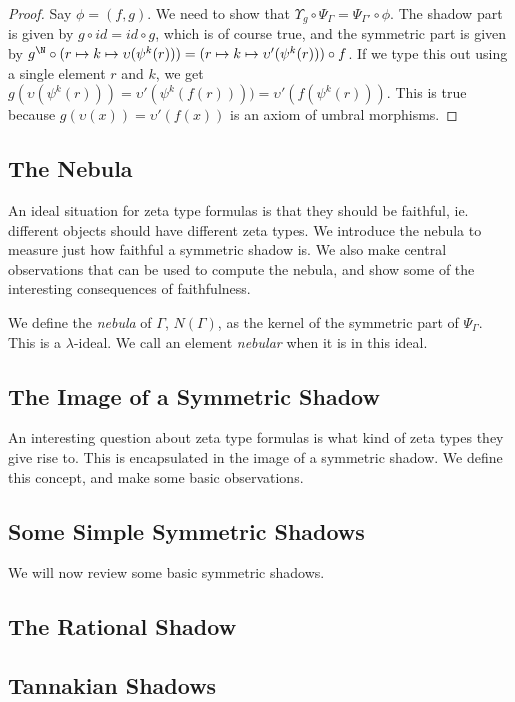 \begin{proof}
  Say $\phi = (f, g)$. We need to show that $\Upsilon_{g} \circ \Psi_\Gamma = \Psi_{\Gamma'} \circ \phi$. The shadow part is given by $g \circ id = id \circ g$, which is of course true, and the symmetric part is given by $g^{\N} \circ (r \mapsto k \mapsto \upsilon(\psi^k(r))) = (r \mapsto k \mapsto \upsilon'(\psi^k(r))) \circ f$. If we type this out using a single element $r$ and $k$, we get $g(\upsilon(\psi^k(r))) = \upsilon'(\psi^k(f(r)))) = \upsilon'(f(\psi^k(r)))$. This is true because $g(\upsilon(x)) = \upsilon'(f(x))$ is an axiom of umbral morphisms. \qedhere
\end{proof}

\subsection{The Nebula}
An ideal situation for zeta type formulas is that they should be faithful, ie. different objects should have different zeta types. We introduce the nebula to measure just how faithful a symmetric shadow is. We also make central observations that can be used to compute the nebula, and show some of the interesting consequences of faithfulness. 


\begin{definition}
  We define the \emph{nebula} of $\Gamma$, $N(\Gamma)$, as the kernel of the symmetric part of $\Psi_\Gamma$. This is a $\lambda$-ideal. We call an element \emph{nebular} when it is in this ideal.
\end{definition}

\subsection{The Image of a Symmetric Shadow}
An interesting question about zeta type formulas is what kind of zeta types they give rise to. This is encapsulated in the image of a symmetric shadow. We define this concept, and make some basic observations.

\subsection{Some Simple Symmetric Shadows}
We will now review some basic symmetric shadows.

\subsection{The Rational Shadow}

\subsection{Tannakian Shadows}
